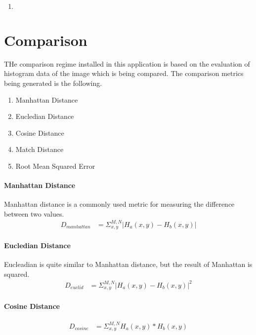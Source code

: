 \begin{multicols}{2}
\begin{enumerate}
	\item 
\end{enumerate}
\end{multicols}

\section{}


\section{Comparison}
THe comparison regime installed in this application is based on the evaluation
of histogram data of the image which is being compared.  The comparison metrics
being generated is the following.
\begin{multicols}{3}
\begin{enumerate}
	\item Manhattan Distance
	\item Eucledian Distance
	\item Cosine Distance
	\item Match Distance
	\item Root Mean Squared Error
\end{enumerate}
\end{multicols}

\paragraph{Manhattan Distance}
Manhattan distance is a commonly used metric for measuring the difference
between two values.
\begin{align}
	D_{manhattan} &= \Sigma^{M,N}_{x,y} | H_{a}(x,y) - H_{b}(x,y) |
\end{align}

\paragraph{Eucledian Distance}
Eucleadian is quite similar to Manhattan distance, but the result of Manhattan
is squared.
\begin{align}
	D_{euclid} &= \Sigma^{M,N}_{x,y} |H_a(x,y) - H_b(x,y)|^2 
\end{align}

\paragraph{Cosine Distance}
\begin{align}
	D_{cosine} &= \Sigma^{M,N}_{x,y}  H_a(x,y) * H_b(x,y)
\end{align}

